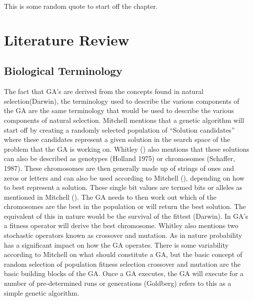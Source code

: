 \begin{savequote}[75mm] 
This is some random quote to start off the chapter.
\end{savequote}

\chapter{Literature Review}
\section{Biological Terminology}
The fact that GA’s are derived from the concepts found in natural selection(Darwin), the terminology used to describe the various components of the GA are the same terminology that would be used to describe the various components of natural selection. Mitchell mentions that a genetic algorithm will start off by creating a randomly selected population of “Solution candidates” where these candidates represent a given solution in the search space of the problem that the GA is working on. Whitley () also mentions that these solutions can also be described as genotypes (Holland 1975) or chromosomes (Schaffer, 1987). These chromosomes are then generally made up of strings of ones and zeros or letters and can also be used according to Mitchell (), depending on how to best represent a solution.  These single bit values are termed bits or alleles as mentioned in Mitchell (). The GA needs to then work out which of the chromosomes are the best in the population or will return the best solution.  The equivalent of this in nature would be the survival of the fittest (Darwin).  In GA’s a fitness operator will derive the best chromosome.   Whitley also mentions two stochastic operators known as crossover and mutation.  As in nature probability has a significant impact on how the GA operates. There is some variability according to Mitchell on what should constitute a GA, but the basic concept of random selection of population fitness selection crossover and mutation are the basic building blocks of the GA.  Once a GA executes, the GA will execute for a number of pre-determined runs or generations (Goldberg) refers to this as a simple genetic algorithm. 

